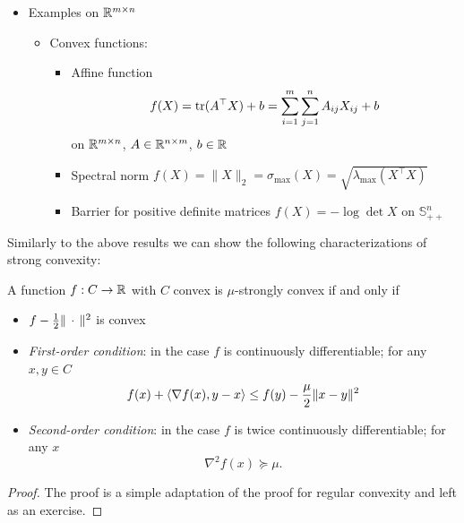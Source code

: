 \begin{example}
\begin{itemize}
\begin{itemize}
            \begin{itemize}
                \item Minimum over affine functions
                    \[
                        f(x)=\min\{\inner{a_1}{x}+b_1,\ldots,\inner{a_m}{x}+b_m\}
                    \]
            \end{itemize}
        \end{itemize}
        \item Examples on $\mathbb{R}^{m\times n}$
        \begin{itemize}
            \item Convex functions:
            \begin{itemize}
                \item Affine function
                    \[
                        f(X)=\operatorname{\mathrm{tr}}(A^\top X)+b=\sum_{i=1}^m\sum_{j=1}^n A_{ij}X_{ij}+b
                    \]
                    on $\mathbb{R}^{m\times n}$, $A\in\mathbb{R}^{n\times m}$, $b\in \mathbb{R}$
                \item Spectral norm $f(X)=\|X\|_2=\sigma_{\text{max}}(X)=\sqrt{\lambda_{\text{max}}(X^\top X)}$
                \item Barrier for positive definite matrices $f(X)=-\log\det X$ on $\mathbb{S}_{++}^n$
            \end{itemize}
        \end{itemize}
    \end{itemize}
\end{example}

Similarly to the above results we can show the following characterizations of strong convexity:

\begin{theorem}
    A function $f:C\rightarrow \mathbb{R}$ with $C$ convex is $\mu$-strongly convex if and only if
    \begin{itemize}
        \item  $f - \frac12 \|\,\cdot\,\|^2$ is convex
        \item \emph{First-order condition}: in the case $f$ is continuously differentiable; for any $x,y\in C$
        \[
            f(x) + \left\langle\nabla f(x) , y-x\right\rangle\leq f(y) - \frac{\mu}{2}\|x-y\|^2
        \]
        \item \emph{Second-order condition}: in the case $f$ is twice continuously differentiable; for any $x$
        \[
            \nabla^2 f(x)\succeq \mu.
        \]
    \end{itemize}
\end{theorem}
\begin{proof}
    The proof is a simple adaptation of the proof for regular convexity and left as an exercise.
\end{proof}